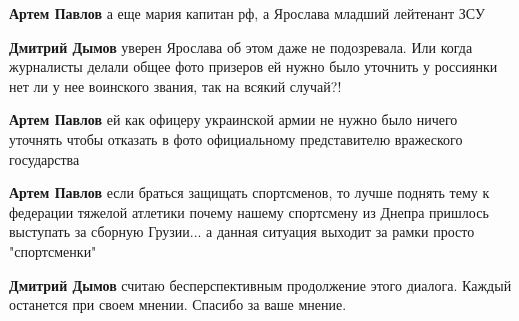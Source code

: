 \begin{itemize}
\begin{itemize}
 
\textbf{Артем Павлов} а еще мария капитан рф, а Ярослава младший лейтенант ЗСУ

 
\textbf{Дмитрий Дымов} уверен Ярослава об этом даже не подозревала. Или когда
журналисты делали общее фото призеров ей нужно было уточнить у россиянки нет ли
у нее воинского звания, так на всякий случай?!

 
\textbf{Артем Павлов} ей как офицеру украинской армии не нужно было ничего
уточнять чтобы отказать в фото официальному представителю вражеского
государства

 
\textbf{Артем Павлов} если браться защищать спортсменов, то лучше поднять тему
к федерации тяжелой атлетики почему нашему спортсмену из Днепра пришлось
выступать за сборную Грузии... а данная ситуация выходит за рамки просто
"спортсменки"

 
\textbf{Дмитрий Дымов} считаю бесперспективным продолжение этого диалога. Каждый останется при своем мнении. Спасибо за ваше мнение.

 

\end{itemize}
\end{itemize}
